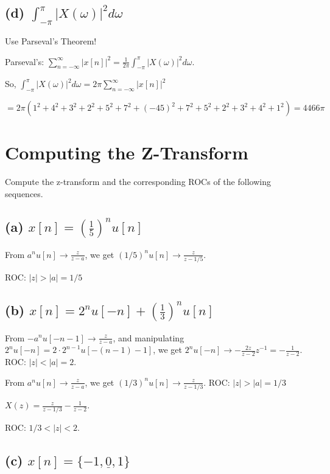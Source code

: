 \documentclass[11pt]{article}
\begin{document}
\subsection{(d) $\int_{-\pi}^\pi |X(\omega)|^2 d\omega$}

{\color{blue}

Use Parseval's Theorem!

Parseval's: $\sum\limits_{n=-\infty}^\infty |x[n]|^2 = \frac{1}{2\pi} \int_{-\pi}^\pi |X(\omega)|^2 d\omega$.

So, $\int_{-\pi}^\pi |X(\omega)|^2 d\omega = 2\pi \sum\limits_{n=-\infty}^\infty |x[n]|^2$


$ = 2\pi  \left(1^2+4^2+3^2+2^2+5^2+7^2 +(-45)^2+7^2+5^2+2^2+3^2+4^2+1^2 \right) = 4466 \pi$

}

\section{Computing the Z-Transform}
Compute the z-transform and the corresponding ROCs of the following sequences.

\subsection*{(a) $x[n]=\left(\frac{1}{5}\right)^nu[n]$}

{\color{blue}
From $a^nu[n] \rightarrow \frac{z}{z-a}$, we get $(1/5)^nu[n] \rightarrow \frac{z}{z-1/5}$.

ROC: $|z| > |a| = 1/5$
}

\subsection*{(b) $x[n]=2^nu[-n]+\left(\frac{1}{3}\right)^nu[n]$}

{\color{blue}
From $-a^nu[-n-1] \rightarrow \frac{z}{z-a}$, and manipulating $2^nu[-n]=2\cdot 2^{n-1}u[-(n-1)-1]$, we get $2^nu[-n] \rightarrow -\frac{2z}{z-2}z^{-1}=-\frac{1}{z-2}$. ROC: $|z| < |a| = 2$.

From $a^nu[n] \rightarrow \frac{z}{z-a}$, we get $(1/3)^nu[n] \rightarrow \frac{z}{z-1/3}$. ROC: $|z| > |a| = 1/3$

$X(z) = \frac{z}{z-1/3}-\frac{1}{z-2}$.

ROC: $1/3 < |z| < 2$.
}

\subsection*{(c) $x[n]=\{-1,\underline{0},1\}$}
\end{document}
